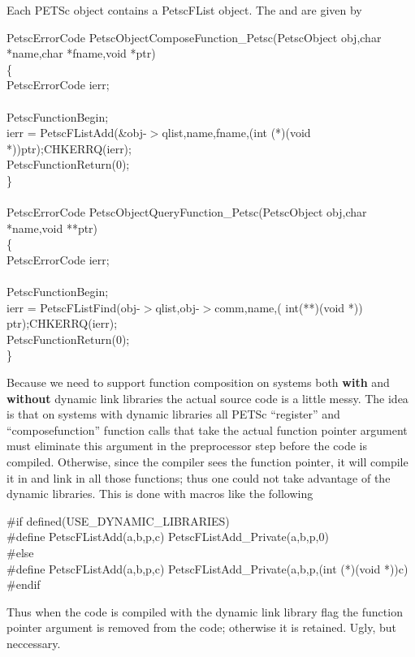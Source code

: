\documentclass[twoside,12pt]{../sty/report_petsc}
\begin{document}
Each PETSc object contains a PetscFList object. The  and 
 are given by 

\begin{tabbing}
PetscErrorCode PetscObjectComposeFunction\_Petsc(PetscObject obj,char *name,char *fname,void *ptr)\\
\{\\
  PetscErrorCode ierr;\\
\\
  PetscFunctionBegin;\\
  ierr = PetscFListAdd(\&obj-$>$qlist,name,fname,(int (*)(void *))ptr);CHKERRQ(ierr);\\
  PetscFunctionReturn(0);\\
\}\\
\\
PetscErrorCode PetscObjectQueryFunction\_Petsc(PetscObject obj,char *name,void **ptr)\\
\{\\
  PetscErrorCode ierr;\\
\\
  PetscFunctionBegin;\\
  ierr = PetscFListFind(obj-$>$qlist,obj-$>$comm,name,( int(**)(void *)) ptr);CHKERRQ(ierr);\\
  PetscFunctionReturn(0);\\
\}
\end{tabbing}

  Because we need to support function composition on systems both {\bf with} and {\bf without} 
dynamic link libraries the actual source code is a little messy. The idea is that
on systems with dynamic libraries all PETSc ``register'' and ``composefunction''
function calls that take the actual 
function pointer argument must eliminate this argument in the preprocessor step before 
the code is compiled. Otherwise, since the compiler sees the function pointer, it will 
compile it in and link in all those functions; thus one could not take advantage of the
dynamic libraries. This is done with macros like the following
\begin{tabbing}
\#if defined(USE\_DYNAMIC\_LIBRARIES)\\
\#define       PetscFListAdd(a,b,p,c) PetscFListAdd\_Private(a,b,p,0)\\
\#else\\
\#define       PetscFListAdd(a,b,p,c) PetscFListAdd\_Private(a,b,p,(int (*)(void *))c)\\
\#endif\\
\end{tabbing}
Thus when the code is compiled with the dynamic link library flag the function pointer 
argument is removed from the code; otherwise it is retained. Ugly, but neccessary.
\end{document}
